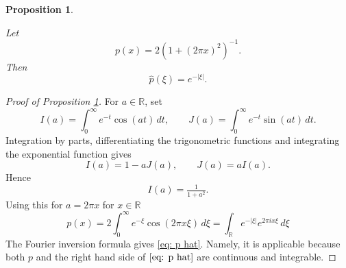 \documentclass[12pt,reqno]{amsart}
\theoremstyle{plain}
\newtheorem{proposition}[theorem]{Proposition}
\numberwithin{equation}{section}
\theoremstyle{remark}
\newcommand{\uses}[1]{}
\newcommand{\usesdefs}[1]{}
\newcommand{\leanok}{}
\newcommand{\lean}[1]{}
\newcommand{\R}{{\mathbb R}}
\begin{document}
\begin{proposition}\label{poisson to abel}\uses{}\usesdefs{}
\lean{Auto.poissonKernel,Auto.poissonKernel_fourier}
\leanok
Let
\begin{equation}\label{auto:Gaussian-comparison-function}
    p(x)=2(1+(2\pi x)^2)^{-1}.
\end{equation}
Then
\begin{equation}\label{eq: p hat}
    \widehat{p}(\xi)=e^{- |\xi|}.
\end{equation}
\end{proposition}
\begin{proof}[Proof of Proposition \ref{poisson to abel}]
For \(a\in\R\), set
\[
    I(a)=\int_0^\infty e^{-t}\cos(at)\,dt,
    \qquad
    J(a)=\int_0^\infty e^{-t}\sin(at)\,dt.
\]
Integration by parts, differentiating the trigonometric functions and integrating the exponential function gives
\[
    I(a)=1-aJ(a),
    \qquad
    J(a)=aI(a).
\]
Hence
\[
    I(a)=\tfrac{1}{1+a^2}.
\]
Using this for $a=2\pi x$ for \(x\in\R\)
\begin{equation}
    p(x)=2\int_0^\infty e^{-\xi}\cos(2\pi x\xi)\,d\xi  =\int_{\R}e^{-|\xi|}e^{2\pi i x\xi}\,d\xi
\end{equation}
 The Fourier inversion formula gives \eqref{eq: p hat}. Namely, it is applicable because
 both $p$ and the right hand side of $\eqref{eq: p hat}$ are continuous and integrable.

\end{proof}
\end{document}
